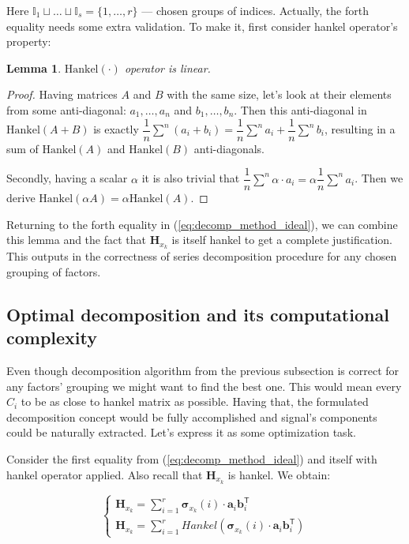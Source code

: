 \documentclass[referee, pdflatex]{sn-jnl}
\theoremstyle{definition}
\theoremstyle{plain}
\newtheorem{Lem}{Lemma}
\begin{document}
	Here $ \mathbb{I}_1 \sqcup \ldots \sqcup \mathbb{I}_s = \{1, \ldots, r\} $ --- chosen groups of indices. Actually, the forth equality needs some extra validation. To make it, first consider hankel operator's property:
	
	\begin{Lem}
		$ \text{Hankel}(\cdot) $ operator is linear.
	\end{Lem}
	
	\begin{proof}		
		Having matrices $ A $ and $ B $ with the same size, let's look at their elements from some anti-diagonal: $ a_1, \ldots, a_n $ and $ b_1, \ldots, b_n $. Then this anti-diagonal in $ \text{Hankel}(A + B) $ is exactly $ \dfrac{1}{n} \sum\limits^n (a_i + b_i) = \dfrac{1}{n} \sum\limits^n a_i + \dfrac{1}{n} \sum\limits^n b_i $, resulting in a sum of  $ \text{Hankel}(A) $ and $ \text{Hankel}(B) $ anti-diagonals.
		
		Secondly, having a scalar $ \alpha $ it is also trivial that $ \dfrac{1}{n} \sum\limits^n \alpha \cdot a_i = \alpha \dfrac{1}{n} \sum\limits^n a_i $. Then we derive $ \text{Hankel}(\alpha A) = \alpha \text{Hankel}(A) $.
	\end{proof}
	
	Returning to the forth equality in (\ref{eq:decomp_method_ideal}), we can combine this lemma and the fact that $ \mathbf{H}_{x_k} $ is itself hankel to get a complete justification. This outputs in the correctness of series decomposition procedure for any chosen grouping of factors.
	
	\subsection{Optimal decomposition and its computational complexity}\label{sec:optimal_decomp}
	
	Even though decomposition algorithm from the previous subsection is correct for any factors' grouping we might want to find the best one. This would mean every $ C_i $ to be as close to hankel matrix as possible. Having that, the formulated decomposition concept would be fully accomplished and signal's components could be naturally extracted. Let's express it as some optimization task.
	
	Consider the first equality from (\ref{eq:decomp_method_ideal}) and itself with hankel operator applied. Also recall that $ \mathbf{H}_{x_k} $ is hankel. We obtain:
	
	\begin{equation*}
		\begin{cases*}
			\mathbf{H}_{x_k} = \sum\limits_{i = 1}^{r} \boldsymbol{\sigma}_{x_k}(i) \cdot \mathbf{a}_i  \mathbf{b}_i^{\mathsf{T}} \\
			\mathbf{H}_{x_k} = \sum\limits_{i = 1}^{r} Hankel(\boldsymbol{\sigma}_{x_k}(i) \cdot \mathbf{a}_i  \mathbf{b}_i^{\mathsf{T}})
		\end{cases*}
	\end{equation*}
	
\end{document}
